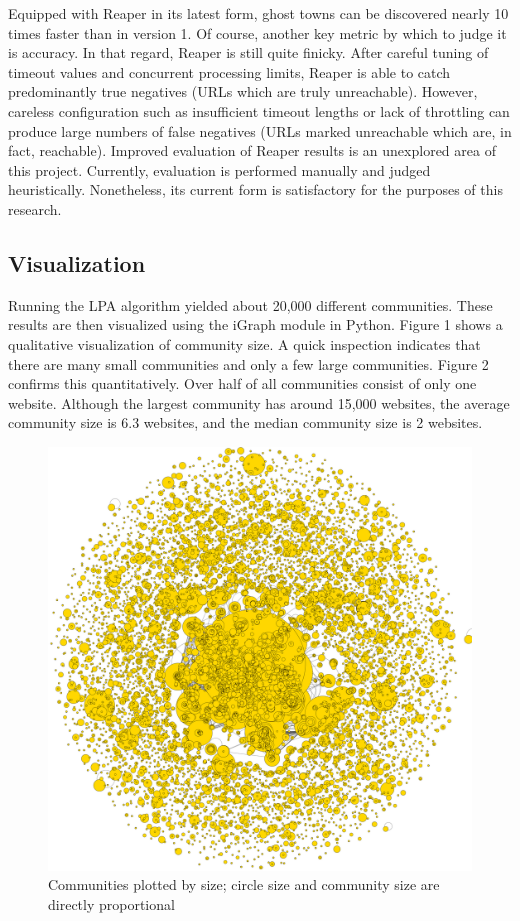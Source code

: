 \documentclass[conference]{IEEEtran}
\begin{document}
Equipped with Reaper in its latest form, ghost towns can be discovered nearly 10 times faster than in version 1. Of course, another key metric by which to judge it is accuracy. In that regard, Reaper is still quite finicky. After careful tuning of timeout values and concurrent processing limits, Reaper is able to catch predominantly true negatives (URLs which are truly unreachable). However, careless configuration such as insufficient timeout lengths or lack of throttling can produce large numbers of false negatives (URLs marked unreachable which are, in fact, reachable). Improved evaluation of Reaper results is an unexplored area of this project. Currently, evaluation is performed manually and judged heuristically. Nonetheless, its current form is satisfactory for the purposes of this research.

\subsection{Visualization}

Running the LPA algorithm yielded about 20,000 different communities. These results are then visualized using the iGraph module in Python. Figure 1 shows a qualitative visualization of community size. A quick inspection indicates that there are many small communities and only a few large communities. Figure 2 confirms this quantitatively. Over half of all communities consist of only one website. Although the largest community has around 15,000 websites, the average community size is 6.3 websites, and the median community size is 2 websites.

\begin{figure}[htbp]
 \centerline{\includegraphics[width=\columnwidth]{communities_by_size.png}}
 \caption{Communities plotted by size; circle size and community size are directly proportional}
\end{figure}
\end{document}
